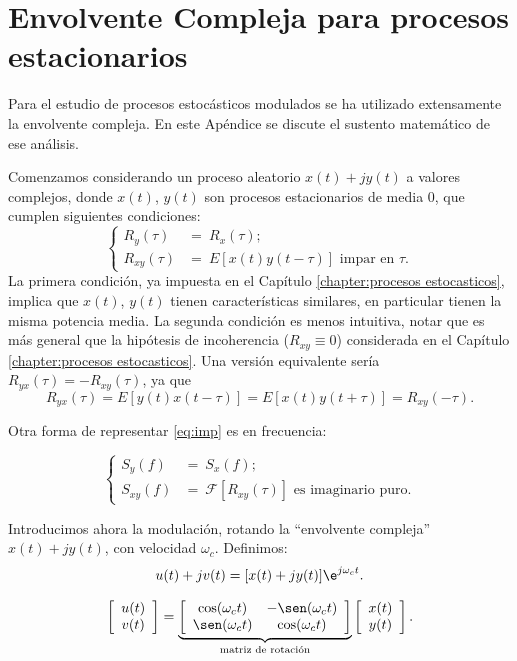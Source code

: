 \section{Envolvente Compleja para procesos estacionarios}

Para el estudio de procesos estocásticos modulados se ha utilizado extensamente
la envolvente compleja. En este Apéndice se discute el sustento matemático de ese análisis. 


Comenzamos considerando un proceso aleatorio $x(t) + j y(t)$ a valores complejos,
donde  $x(t)$, $y(t)$ son procesos estacionarios de media 0, que cumplen siguientes condiciones: 
\begin{equation*}
    \label{eq:imp}
    \begin{cases}
R_y(\tau)&=\ R_x(\tau);\\
                    R_{xy}(\tau)&=\ E\left[x(t)y(t-\tau)\right]\text{ impar en
                    $\tau$}.
                    \end{cases}
                \tag{\#}
\end{equation*}
La primera condición, ya impuesta en el Capítulo \ref{chapter:procesos estocasticos},  implica que $x(t)$, $y(t)$ tienen
características similares, en particular tienen la misma potencia media. La segunda condición es menos intuitiva, notar que es más general que la hipótesis de incoherencia ($R_{xy}\equiv 0$) considerada en el Capítulo \ref{chapter:procesos estocasticos}. Una versión  equivalente sería  $R_{yx}(\tau)=-R_{xy}(\tau)$, ya que
\[R_{yx}(\tau)=E\left[y(t)x(t-\tau)\right]=E\left[x(t)y(t+\tau)\right]=R_{xy}(-\tau).\]

 Otra forma de representar
\eqref{eq:imp} es en frecuencia:

\[\begin{cases} S_y(f)&= \ S_x(f);\\
                S_{xy}(f)&= \ \mathcal{F}\left[R_{xy}(\tau)\right]\text{ es imaginario
                puro}.
              \end{cases}\tag{\#}\]


Introducimos ahora la modulación, rotando la ``envolvente
compleja'' $x(t)+jy(t)$, con velocidad $\omega_c$. Definimos:
\[u(t)+jv(t)=[x(t)+jy(t)]\e^{j\omega_ct}.\]

\begin{equation*}
    \left[\begin{array}{c}
            u(t)\\
            v(t)
          \end{array}\right]
    = \underbrace{\left[\begin{array}{cc}
                \cos(\omega_ct) & -\sen(\omega_ct)\\
                \sen(\omega_ct) & \cos(\omega_ct)
            \end{array}\right]}_{\text{matriz de rotación}}
    \left[\begin{array}{c}
            x(t)\\
            y(t)
          \end{array}\right].
\end{equation*}

